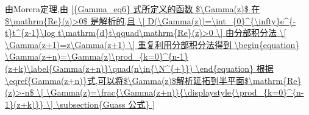 	由Morera定理,由 \autoref{{Gamma_eq6} 式所定义的函数 $\Gamma(z)$ 在 $\mathrm{Re}(z)>0$ 是解析的,且
	\[
		D(\Gamma(z))=\int_{0}^{\infty}e^{-t}t^{z-1}\log t\mathrm{d}t\qquad\mathrm{Re}(z)>0
	\]
	由分部积分法
	\[
		\Gamma(z+1)=z\Gamma(z+1)
	\]
	重复利用分部积分法得到
	\begin{equation}
		\Gamma(z+n)=\Gamma(z)\prod_{k=0}^{n-1}(z+k)\label{Gamma(z+n)}\quad(n\in{\N^{+}})
	\end{equation}
	根据\eqref{Gamma(z+n)}式,可以将$\Gamma(z)$解析延拓到半平面$\mathrm{Re}(z)>-n$
	\[
		\Gamma(z)=\frac{\Gamma(z+n)}{\displaystyle{\prod_{k=0}^{n-1}(z+k)}}
	\]

	\subsection{Guass 公式}

}
